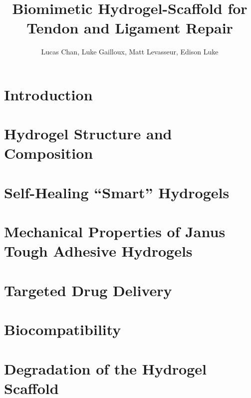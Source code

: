 \documentclass[
    letterpaper,
    10pt,
    unnumberedsections,
    twoside
]{LTJournalArticle}
\title{Biomimetic Hydrogel-Scaffold for Tendon and Ligament Repair}
\author{Lucas Chan, Luke Gailloux, Matt Levasseur, Edison Luke}
\begin{document}
    \maketitle 

    \section{Introduction}

    

    \section{Hydrogel Structure and Composition}

    

    \section{Self-Healing ``Smart'' Hydrogels}

    

    

    \section{Mechanical Properties of Janus Tough Adhesive Hydrogels}

    

    \section{Targeted Drug Delivery}

    

    \section{Biocompatibility}

    

    \section{Degradation of the Hydrogel Scaffold}

    


    

    \onecolumn
    \printbibliography
\end{document}

